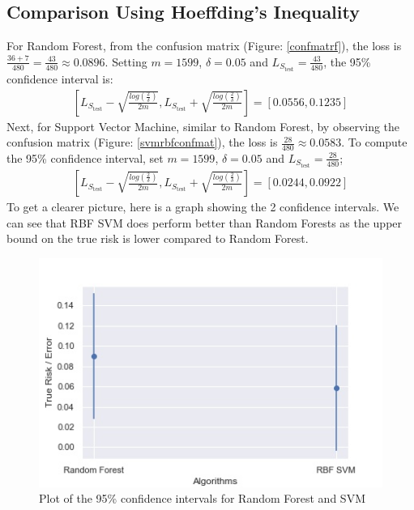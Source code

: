 \documentclass[a4paper,titlepage]{article}
\begin{document}
	\subsection{Comparison Using Hoeffding's Inequality}
	For Random Forest, from the confusion matrix (Figure: \ref{confmatrf}), the loss is $\frac{36+7}{480}=\frac{43}{480}\approx 0.0896$. Setting $m=1599$, $\delta=0.05$ and $L_{S_{\text{test}}}=\frac{43}{480}$, the 95\% confidence interval is:
	\begin{align}
		\left[L_{S_{\text{test}}}-\sqrt{\frac{log\left(\frac{2}{\delta}\right)}{2m}},L_{S_{\text{test}}}+\sqrt{\frac{log\left(\frac{2}{\delta}\right)}{2m}}\right]=[0.0556,0.1235]
	\end{align}
	Next, for Support Vector Machine, similar to Random Forest, by observing the confusion matrix (Figure: \ref{svmrbfconfmat}), the loss is $\frac{28}{480}\approx 0.0583$. To compute the 95\% confidence interval, set $m=1599$, $\delta=0.05$ and $L_{S_{\text{test}}}=\frac{28}{480}$;
	\begin{align}
		\left[L_{S_{\text{test}}}-\sqrt{\frac{log\left(\frac{2}{\delta}\right)}{2m}},L_{S_{\text{test}}}+\sqrt{\frac{log\left(\frac{2}{\delta}\right)}{2m}}\right]=[0.0244,0.0922]
	\end{align}
	To get a clearer picture, here is a graph showing the 2 confidence intervals. We can see that RBF SVM does perform better than Random Forests as the upper bound on the true risk is lower compared to Random Forest. 
	\begin{figure}[H]
		\centering
		\includegraphics[scale=0.6]{img/binary_errorgraph.jpg}
		\caption{Plot of the 95\% confidence intervals for Random Forest and SVM}
	\end{figure}
\end{document}
